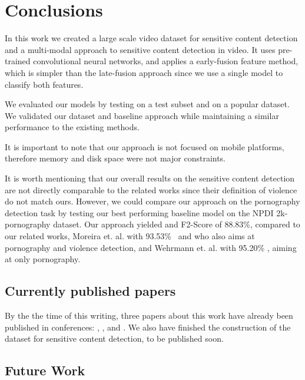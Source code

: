 \newpage

\chapter{Conclusions}
\label{chap:conclusions}

In this work we created a large scale video dataset for sensitive content detection and a multi-modal approach to sensitive content detection in video. 
It uses pre-trained convolutional neural networks, and applies a early-fusion feature method, which is simpler than the late-fusion approach since we use a single model to classify both features.

We evaluated our models by testing on a test subset and on a popular dataset. We validated our dataset and baseline approach while maintaining a similar performance to the existing methods.

It is important to note that our approach is not focused on mobile platforms, therefore memory and disk space were not major constraints. 

It is worth mentioning that our overall results on the sensitive content detection are not directly comparable to the related works since their definition of violence do not match ours. However, we could compare our approach on the pornography detection task by testing our best performing baseline model on the NPDI 2k-pornography dataset. Our approach yielded and F2-Score of 88.83\%, compared to our related works, Moreira et. al. with
93.53\%~\cite{moreira2019multimodal} and who also aims at pornography and violence detection, and
Wehrmann et. al. with 95.20\% \cite{wehrmann2018adult}, aiming at only pornography.

\section{Currently published papers}
\label{sec:contrib}

By the the time of this writing, three papers about this work have already been published in conferences: \cite{2019NSFWbaseline}, \cite{2020PornDetectionSBIE}, and \cite{shouldisee}. We also have finished the construction of the dataset for sensitive content detection, to be published soon.

\section{Future Work}
\label{sec:future}


